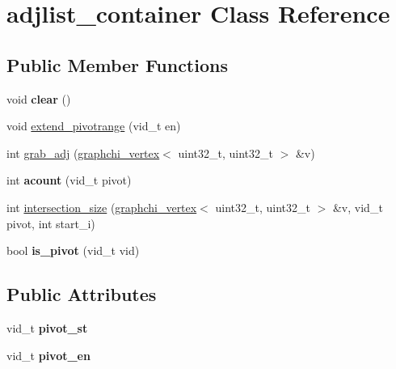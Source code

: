\hypertarget{classadjlist__container}{\section{adjlist\-\_\-container Class Reference}
\label{classadjlist__container}
}
\subsection*{Public Member Functions}
\begin{DoxyCompactItemize}
\item 
\hypertarget{classadjlist__container_a236081fd44719d380ad8b48116366745}{void {\bfseries clear} ()}\label{classadjlist__container_a236081fd44719d380ad8b48116366745}

\item 
void \hyperlink{classadjlist__container_ac43be3ce9e2e0f19cc1d52e13f766e28}{extend\-\_\-pivotrange} (vid\-\_\-t en)
\item 
int \hyperlink{classadjlist__container_a01e1226beec003fdff368951031804f9}{grab\-\_\-adj} (\hyperlink{classgraphchi_1_1graphchi__vertex}{graphchi\-\_\-vertex}$<$ uint32\-\_\-t, uint32\-\_\-t $>$ \&v)
\item 
\hypertarget{classadjlist__container_a2cd6ffb88256e51ca1a6b52b6e344a05}{int {\bfseries acount} (vid\-\_\-t pivot)}\label{classadjlist__container_a2cd6ffb88256e51ca1a6b52b6e344a05}

\item 
int \hyperlink{classadjlist__container_aa9956e2b1bdbd885ec58037d84febef6}{intersection\-\_\-size} (\hyperlink{classgraphchi_1_1graphchi__vertex}{graphchi\-\_\-vertex}$<$ uint32\-\_\-t, uint32\-\_\-t $>$ \&v, vid\-\_\-t pivot, int start\-\_\-i)
\item 
\hypertarget{classadjlist__container_aee04887c7a6764ad18b38ff29712df6f}{bool {\bfseries is\-\_\-pivot} (vid\-\_\-t vid)}\label{classadjlist__container_aee04887c7a6764ad18b38ff29712df6f}

\end{DoxyCompactItemize}
\subsection*{Public Attributes}
\begin{DoxyCompactItemize}
\item 
\hypertarget{classadjlist__container_a1aa05230b7526183677420251be8daf1}{vid\-\_\-t {\bfseries pivot\-\_\-st}}\label{classadjlist__container_a1aa05230b7526183677420251be8daf1}

\item 
\hypertarget{classadjlist__container_aa0c56c40c2bb02337cfce73d7ca1b45e}{vid\-\_\-t {\bfseries pivot\-\_\-en}}\label{classadjlist__container_aa0c56c40c2bb02337cfce73d7ca1b45e}

\end{DoxyCompactItemize}


